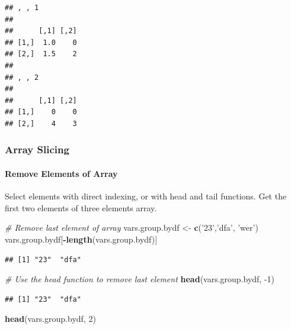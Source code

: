 \documentclass[
]{book}
\newenvironment{Shaded}{\begin{snugshade}}{\end{snugshade}}
\newcommand{\CommentTok}[1]{\textcolor[rgb]{0.56,0.35,0.01}{\textit{#1}}}
\newcommand{\DecValTok}[1]{\textcolor[rgb]{0.00,0.00,0.81}{#1}}
\newcommand{\KeywordTok}[1]{\textcolor[rgb]{0.13,0.29,0.53}{\textbf{#1}}}
\newcommand{\NormalTok}[1]{#1}
\newcommand{\OperatorTok}[1]{\textcolor[rgb]{0.81,0.36,0.00}{\textbf{#1}}}
\newcommand{\StringTok}[1]{\textcolor[rgb]{0.31,0.60,0.02}{#1}}
\begin{document}
\begin{verbatim}
## , , 1
## 
##      [,1] [,2]
## [1,]  1.0    0
## [2,]  1.5    2
## 
## , , 2
## 
##      [,1] [,2]
## [1,]    0    0
## [2,]    4    3
\end{verbatim}

\hypertarget{array-slicing}{%
\subsubsection{Array Slicing}\label{array-slicing}}

\hypertarget{remove-elements-of-array}{%
\paragraph{Remove Elements of Array}\label{remove-elements-of-array}}

Select elements with direct indexing, or with head and tail functions. Get the first two elements of three elements array.

\begin{Shaded}
\begin{Highlighting}[]
\CommentTok{# Remove last element of array}
\NormalTok{vars.group.bydf <-}\StringTok{ }\KeywordTok{c}\NormalTok{(}\StringTok{'23'}\NormalTok{,}\StringTok{'dfa'}\NormalTok{, }\StringTok{'wer'}\NormalTok{)}
\NormalTok{vars.group.bydf[}\OperatorTok{-}\KeywordTok{length}\NormalTok{(vars.group.bydf)]}
\end{Highlighting}
\end{Shaded}

\begin{verbatim}
## [1] "23"  "dfa"
\end{verbatim}

\begin{Shaded}
\begin{Highlighting}[]
\CommentTok{# Use the head function to remove last element}
\KeywordTok{head}\NormalTok{(vars.group.bydf, }\DecValTok{-1}\NormalTok{)}
\end{Highlighting}
\end{Shaded}

\begin{verbatim}
## [1] "23"  "dfa"
\end{verbatim}

\begin{Shaded}
\begin{Highlighting}[]
\KeywordTok{head}\NormalTok{(vars.group.bydf, }\DecValTok{2}\NormalTok{)}
\end{Highlighting}
\end{Shaded}
\end{document}
